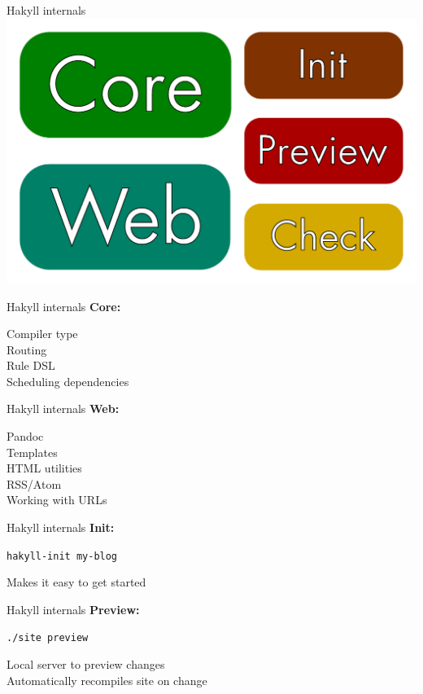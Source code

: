 \documentclass[20pt]{beamer}
\newcommand{\vspaced}{
    \vspace{5mm}
}
\begin{document}

\begin{frame}{Hakyll internals}
    \includegraphics[width=\textwidth]{images/components.pdf}
\end{frame}

\begin{frame}{Hakyll internals}
    \textbf{Core:} \\
    \vspaced
    Compiler type \\
    Routing \\
    Rule DSL \\
    Scheduling dependencies \\
\end{frame}

\begin{frame}{Hakyll internals}
    \textbf{Web:} \\
    \vspaced
    Pandoc \\
    Templates \\
    HTML utilities \\
    RSS/Atom \\
    Working with URLs \\
\end{frame}

\begin{frame}{Hakyll internals}
    \textbf{Init:} \\
    \vspaced
    \texttt{hakyll-init my-blog} \\
    \vspaced
    Makes it easy to get started \\
\end{frame}

\begin{frame}{Hakyll internals}
    \textbf{Preview:} \\
    \vspaced
    \texttt{./site preview} \\
    \vspaced
    Local server to preview changes \\
    Automatically recompiles site on change \\
\end{frame}
\end{document}
